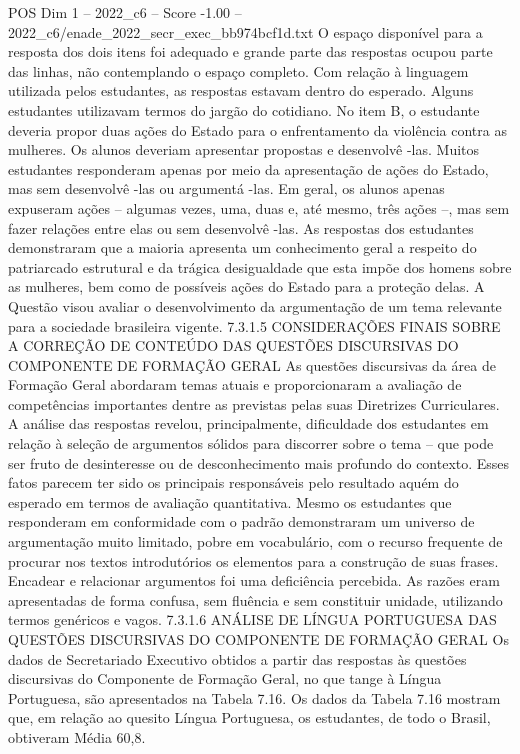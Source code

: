 \begin{textsample}{POS Dim 1 – 2022\_c6 – Score -1.00 – 2022\_c6/enade\_2022\_secr\_exec\_bb974bcf1d.txt}
O espaço disponível para a resposta dos dois itens foi adequado e grande parte das respostas ocupou parte das linhas, não contemplando o espaço completo.
Com relação à linguagem utilizada pelos estudantes, as respostas estavam dentro do esperado.
Alguns estudantes utilizavam termos do jargão do cotidiano.
No item B, o estudante deveria propor duas ações do Estado para o enfrentamento da violência contra as mulheres.
Os alunos deveriam apresentar propostas e desenvolvê -las.
Muitos estudantes responderam apenas por meio da apresentação de ações do Estado, mas sem desenvolvê -las ou argumentá -las.
Em geral, os alunos apenas expuseram ações – algumas vezes, uma, duas e, até mesmo, três ações –, mas sem fazer relações entre elas ou sem desenvolvê -las.
As respostas dos estudantes demonstraram que a maioria apresenta um conhecimento geral a respeito do patriarcado estrutural e da trágica desigualdade que esta impõe dos homens sobre as mulheres, bem como de possíveis ações do Estado para a proteção delas.
A Questão visou avaliar o desenvolvimento da argumentação de um tema relevante para a sociedade brasileira vigente. 7.3.1.5 CONSIDERAÇÕES FINAIS SOBRE A CORREÇÃO DE CONTEÚDO DAS QUESTÕES DISCURSIVAS DO COMPONENTE DE FORMAÇÃO GERAL As questões discursivas da área de Formação Geral abordaram temas atuais e proporcionaram a avaliação de competências importantes dentre as previstas pelas suas Diretrizes Curriculares.
A análise das respostas revelou, principalmente, dificuldade dos estudantes em relação à seleção de argumentos sólidos para discorrer sobre o tema – que pode ser fruto de desinteresse ou de desconhecimento mais profundo do contexto.
Esses fatos parecem ter sido os principais responsáveis pelo resultado aquém do esperado em termos de avaliação quantitativa.
Mesmo os estudantes que responderam em conformidade com o padrão demonstraram um universo de argumentação muito limitado, pobre em vocabulário, com o recurso frequente de procurar nos textos introdutórios os elementos para a construção de suas frases.
Encadear e relacionar argumentos foi uma deficiência percebida.
As razões eram apresentadas de forma confusa, sem fluência e sem constituir unidade, utilizando termos genéricos e vagos. 7.3.1.6 ANÁLISE DE LÍNGUA PORTUGUESA DAS QUESTÕES DISCURSIVAS DO COMPONENTE DE FORMAÇÃO GERAL Os dados de Secretariado Executivo obtidos a partir das respostas às questões discursivas do Componente de Formação Geral, no que tange à Língua Portuguesa, são apresentados na Tabela 7.16.
Os dados da Tabela 7.16 mostram que, em relação ao quesito Língua Portuguesa, os estudantes, de todo o Brasil, obtiveram Média 60,8.

\end{textsample}
